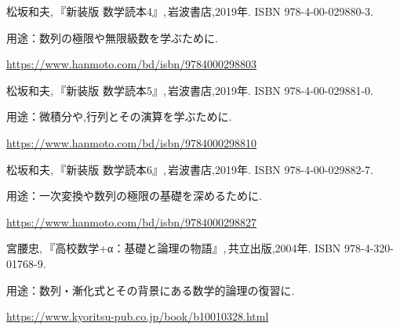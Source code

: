 \begin{enumerate}[label={[\arabic*]}]
    \item \begin{minipage}[t]{\linewidth}\raggedright
        松坂和夫,\,『新装版 数学読本4』,\,岩波書店,2019年.
        ISBN 978-4-00-029880-3.
        \par{\small 用途：数列の極限や無限級数を学ぶために.\par}
        \par\noindent\url{https://www.hanmoto.com/bd/isbn/9784000298803}\par
      \end{minipage}\par\smallskip

    \item \begin{minipage}[t]{\linewidth}\raggedright
        松坂和夫,\,『新装版 数学読本5』,\,岩波書店,2019年.
        ISBN 978-4-00-029881-0.
        \par{\small 用途：微積分や,行列とその演算を学ぶために.\par}
        \par\noindent\url{https://www.hanmoto.com/bd/isbn/9784000298810}\par
      \end{minipage}\par\smallskip

    \item \begin{minipage}[t]{\linewidth}\raggedright
        松坂和夫,\,『新装版 数学読本6』,\,岩波書店,2019年.
        ISBN 978-4-00-029882-7.
        \par{\small 用途：一次変換や数列の極限の基礎を深めるために.\par}
        \par\noindent\url{https://www.hanmoto.com/bd/isbn/9784000298827}\par
      \end{minipage}\par\smallskip

    \item \begin{minipage}[t]{\linewidth}\raggedright
        宮腰忠,\,『高校数学+α：基礎と論理の物語』,\,共立出版,2004年.
        ISBN 978-4-320-01768-9.
        \par{\small 用途：数列・漸化式とその背景にある数学的論理の復習に.\par}
        \par\noindent\url{https://www.kyoritsu-pub.co.jp/book/b10010328.html}\par
      \end{minipage}\par\smallskip

  \end{enumerate}

